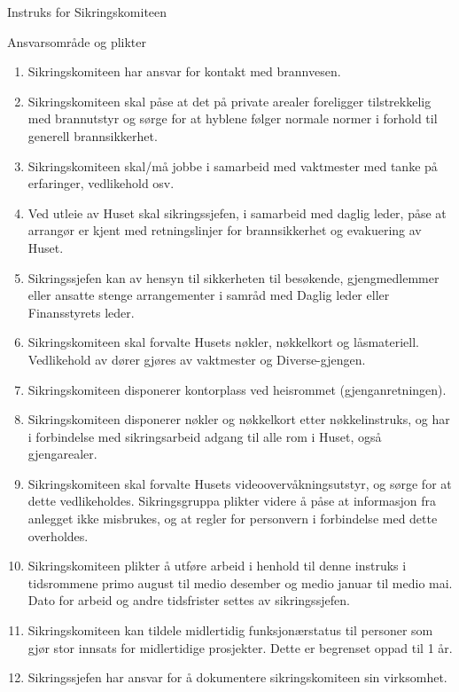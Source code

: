 \begin{instruks*}{Instruks for Sikringskomiteen}
\begin{instruksledd}{Ansvarsområde og plikter}
\begin{enumerate}
            \item Sikringskomiteen har ansvar for kontakt med brannvesen.
            \item Sikringskomiteen skal påse at det på private arealer foreligger
                tilstrekkelig med brannutstyr og sørge for at
                hyblene følger normale normer i forhold til generell brannsikkerhet.
            \item Sikringskomiteen skal/må jobbe i samarbeid med vaktmester med tanke på
                erfaringer, vedlikehold osv.
            \item Ved utleie av Huset skal sikringssjefen, i samarbeid med daglig leder,
                påse at arrangør er kjent med
                retningslinjer for brannsikkerhet og evakuering av Huset.
            \item Sikringssjefen kan av hensyn til sikkerheten til besøkende,
                gjengmedlemmer eller ansatte stenge
                arrangementer i samråd med Daglig leder eller Finansstyrets leder.
            \item Sikringskomiteen skal forvalte Husets nøkler, nøkkelkort og låsmateriell.
                Vedlikehold av dører gjøres av
                vaktmester og Diverse-gjengen.
            \item Sikringskomiteen disponerer kontorplass ved heisrommet
                (gjenganretningen).
            \item Sikringskomiteen disponerer nøkler og nøkkelkort etter nøkkelinstruks,
                og har i forbindelse med
                sikringsarbeid adgang til alle rom i Huset, også gjengarealer.
            \item Sikringskomiteen skal forvalte Husets videoovervåkningsutstyr, og sørge
                for at dette vedlikeholdes.
                Sikringsgruppa plikter videre å påse at informasjon fra anlegget ikke
                misbrukes, og at regler for personvern i
                forbindelse med dette overholdes.
            \item Sikringskomiteen plikter å utføre arbeid i henhold til denne instruks i
                tidsrommene primo august til medio
                desember og medio januar til medio mai. Dato for arbeid og andre
                tidsfrister settes av sikringssjefen.
            \item Sikringskomiteen kan tildele midlertidig funksjonærstatus til personer
                som gjør stor innsats for midlertidige
                prosjekter. Dette er begrenset oppad til 1 år.
            \item Sikringssjefen har ansvar for å dokumentere sikringskomiteen sin
                virksomhet.
        \end{enumerate}
    \end{instruksledd}


\end{instruks*}
